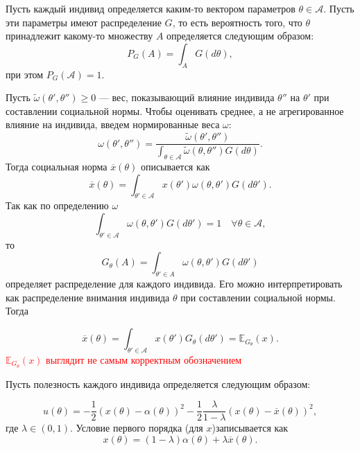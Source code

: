 \documentclass[12pt]{article}
\begin{document}
Пусть каждый индивид определяется каким-то вектором параметров $\theta \in \mathcal{A}$.  Пусть эти параметры имеют распределение $G$,  то есть вероятность того,  что $\theta$ принадлежит какому-то множеству $A$ определяется следующим образом:
$$
P_G(A) = \int_A G(d \theta),
$$
при этом $P_G(\mathcal{A}) =1$.
 
Пусть $\tilde{\omega}(\theta', \theta'') \geqslant 0$ --- вес,  показывающий влияние индивида $\theta''$ на $\theta'$ при составлении социальной нормы.  Чтобы оценивать среднее, а не агрегированное влияние на индивида,  введем нормированные веса $\omega$:
$$
\omega(\theta', \theta'') = \frac{\tilde{\omega}(\theta', \theta'')}{\int_{\theta \in \mathcal{A}} \tilde{\omega}(\theta, \theta'')G(d \theta)} .
$$
Тогда социальная норма $\overline{x}(\theta)$ описывается как
$$
\overline{x}(\theta) = \int_{\theta' \in \mathcal{A}} x(\theta') \omega(\theta, \theta') G(d \theta').
$$
Так как по определению $\omega$
$$
\int_{\theta' \in \mathcal{A}} \omega(\theta, \theta') G(d \theta') = 1 \quad \forall \theta \in \mathcal{A},
$$
то
$$
G_\theta (A) = \int_{\theta' \in A} \omega(\theta, \theta') G(d \theta')
$$
определяет распределение для каждого индивида. Его можно интерпретировать как распределение внимания индивида $\theta$ при составлении социальной нормы.  Тогда

$$
\overline{x}(\theta) =  \int_{\theta' \in \mathcal{A}} x(\theta') G_\theta(d \theta') = \mathbb{E}_{G_\theta}(x).
$$
\textcolor{red}{$\mathbb{E}_{G_\theta}(x)$ выглядит не самым корректным обозначением} 

Пусть полезность каждого индивида определяется следующим образом:

\begin{equation*}
u(\theta) = -\frac{1}{2}(x(\theta)-\alpha(\theta))^2-\frac{1}{2}\frac{\lambda}{1-\lambda}\left(x(\theta) - \overline{x}(\theta)\right)^2,
\end{equation*}
где $\lambda \in (0, 1)$.  Условие первого порядка (для $x$)записывается как
\begin{equation}
\label{eq: x}
x(\theta) = (1-\lambda)\alpha(\theta) + \lambda \overline{x}(\theta).
\end{equation}
\end{document}
